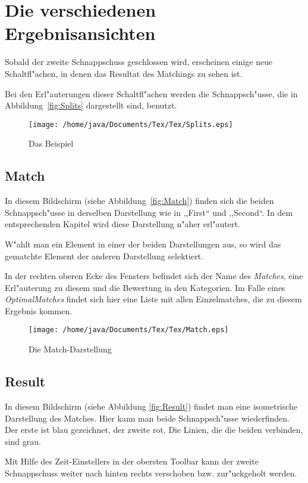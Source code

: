 \section{Die verschiedenen Ergebnisansichten}
Sobald der zweite Schnappschuss geschlossen wird, erscheinen einige neue Schaltfl"achen, in denen  das Resultat des Matchings zu sehen ist.

Bei den Erl"auterungen dieser Schaltfl"achen werden die Schnappsch"usse, die in Abbildung~\vref{fig:Splits} dargestellt sind, benutzt.
\begin{figure}
   \centering
   \texttt{[image: /home/java/Documents/Tex/Tex/Splits.eps]}
   \caption{Das Beispiel}
   \label{fig:Splits}
\end{figure}
\subsection{Match}
In diesem Bildschirm (siehe Abbildung~\vref{fig:Match}) finden sich die beiden Schnappsch"usse in derselben Darstellung wie in ,,First`` und ,,Second``. In dem entsprechenden Kapitel wird diese Darstellung n"aher erl"autert. 

W"ahlt man ein Element in einer der beiden Darstellungen aus, so wird das gematchte Element der anderen Darstellung selektiert. 

In der rechten oberen Ecke des Fensters befindet sich der Name des \textit{Matches}, eine Erl"auterung zu diesem und die Bewertung in den Kategorien. Im Falle eines \textit{OptimalMatches} findet sich hier eine Liste mit allen Einzelmatches, die zu diesem Ergebnis kommen.
\begin{figure}
   \centering
   \texttt{[image: /home/java/Documents/Tex/Tex/Match.eps]}
   \caption{Die Match-Darstellung}
   \label{fig:Match}
\end{figure}

\subsection{Result}
In diesem Bildschirm (siehe Abbildung \vref{fig:Result}) findet man eine isometrische Darstellung des Matches. Hier kann man  beide Schnappsch"usse wiederfinden. Der erste ist blau gezeichnet, der zweite rot. Die Linien, die die beiden verbinden, sind grau. 

Mit Hilfe des Zeit-Einstellers in der obersten Toolbar kann der zweite Schnappschuss weiter nach hinten rechts verschoben bzw. zur"uckgeholt werden. 

